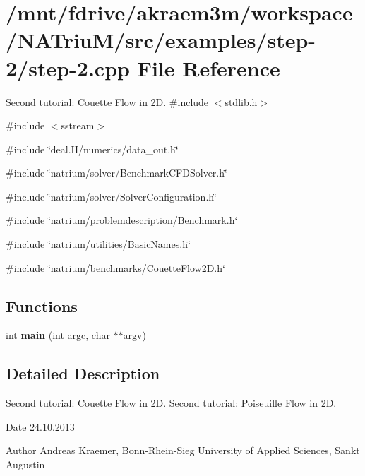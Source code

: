 \hypertarget{step-2_8cpp}{
\section{/mnt/fdrive/akraem3m/workspace/NATriuM/src/examples/step-\/2/step-\/2.cpp File Reference}
\label{step-2_8cpp}
}


Second tutorial: Couette Flow in 2D.  
{\ttfamily \#include $<$stdlib.h$>$}\par
{\ttfamily \#include $<$sstream$>$}\par
{\ttfamily \#include \char`\"{}deal.II/numerics/data\_\-out.h\char`\"{}}\par
{\ttfamily \#include \char`\"{}natrium/solver/BenchmarkCFDSolver.h\char`\"{}}\par
{\ttfamily \#include \char`\"{}natrium/solver/SolverConfiguration.h\char`\"{}}\par
{\ttfamily \#include \char`\"{}natrium/problemdescription/Benchmark.h\char`\"{}}\par
{\ttfamily \#include \char`\"{}natrium/utilities/BasicNames.h\char`\"{}}\par
{\ttfamily \#include \char`\"{}natrium/benchmarks/CouetteFlow2D.h\char`\"{}}\par
\subsection*{Functions}
\begin{DoxyCompactItemize}
\item 
\hypertarget{step-2_8cpp_a3c04138a5bfe5d72780bb7e82a18e627}{
int {\bfseries main} (int argc, char $\ast$$\ast$argv)}
\label{step-2_8cpp_a3c04138a5bfe5d72780bb7e82a18e627}

\end{DoxyCompactItemize}


\subsection{Detailed Description}
Second tutorial: Couette Flow in 2D. Second tutorial: Poiseuille Flow in 2D.

\begin{DoxyDate}{Date}
24.10.2013 
\end{DoxyDate}
\begin{DoxyAuthor}{Author}
Andreas Kraemer, Bonn-\/Rhein-\/Sieg University of Applied Sciences, Sankt Augustin 
\end{DoxyAuthor}

